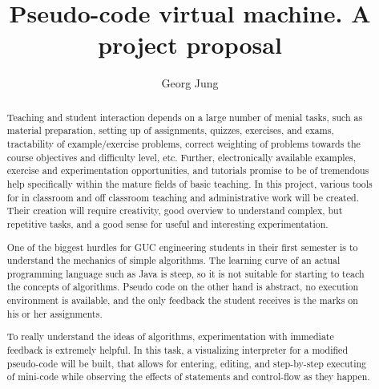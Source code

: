 \documentclass[a4paper]{article}
\author{Georg Jung}
\title{Pseudo-code virtual machine. A project proposal}
\begin{document}
\maketitle

\begin{abstract}
  Teaching and student interaction depends on a large number of menial
  tasks, such as material preparation, setting up of assignments,
  quizzes, exercises, and exams, tractability of example/exercise
  problems, correct weighting of problems towards the course
  objectives and difficulty level, etc. Further, electronically
  available examples, exercise and experimentation opportunities, and
  tutorials promise to be of tremendous help specifically within the
  mature fields of basic teaching. In this project, various tools for
  in classroom and off classroom teaching and administrative work will
  be created. Their creation will require creativity, good overview to
  understand complex, but repetitive tasks, and a good sense for
  useful and interesting experimentation.

  One of the biggest hurdles for GUC engineering students in their
  first semester is to understand the mechanics of simple
  algorithms. The learning curve of an actual programming language
  such as Java is steep, so it is not suitable for starting to teach
  the concepts of algorithms. Pseudo code on the other hand is
  abstract, no execution environment is available, and the only
  feedback the student receives is the marks on his or her
  assignments.

  To really understand the ideas of algorithms, experimentation with
  immediate feedback is extremely helpful. In this task, a visualizing
  interpreter for a modified pseudo-code will be built, that allows
  for entering, editing, and step-by-step executing of mini-code while
  observing the effects of statements and control-flow as they happen.
\end{abstract}
\end{document}
